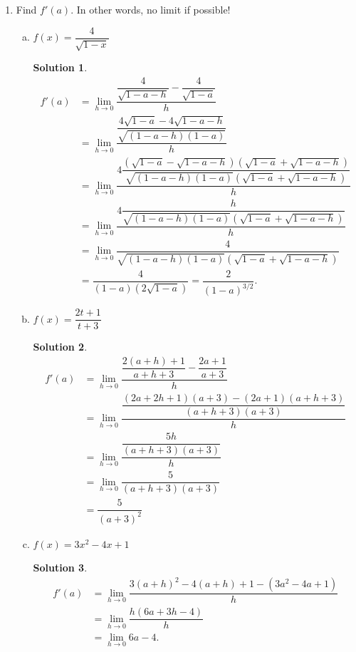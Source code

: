 \documentclass[10pt]{article}
\theoremstyle{Theorem}
\theoremstyle{definition}
\newtheorem*{solution}{Solution}
\theoremstyle{remark}
\theoremstyle{custom}
\begin{document}
\begin{enumerate}[1.]
\begin{enumerate}[a.]
\end{enumerate}
\item Find $f'(a)$. In other words, no limit if possible!
\begin{enumerate}[a.]
\item $f(x)=\dfrac{4}{\sqrt{1-x}}$
\begin{solution}
\begin{align*}
f'(a)&=\lim_{h\rightarrow 0}\dfrac{\dfrac{4}{\sqrt{1-a-h}}-\dfrac{4}{\sqrt{1-a}}}{h}\\[2pt]
&=\lim_{h\rightarrow 0}\dfrac{\dfrac{4\sqrt{1-a}-4\sqrt{1-a-h}}{\sqrt{(1-a-h)(1-a)}}}{h}\\[2pt]
&=\lim_{h\rightarrow 0} \dfrac{4\dfrac{(\sqrt{1-a}-\sqrt{1-a-h})(\sqrt{1-a}+\sqrt{1-a-h})}{\sqrt{(1-a-h)(1-a)}(\sqrt{1-a}+\sqrt{1-a-h})}}{h}\\[2pt]
&=\lim_{h\rightarrow 0}\dfrac{4\dfrac{h}{\sqrt{(1-a-h)(1-a)}(\sqrt{1-a}+\sqrt{1-a-h})}}{h}\\[2pt]
&=\lim_{h\rightarrow 0}\dfrac{4}{\sqrt{(1-a-h)(1-a)}(\sqrt{1-a}+\sqrt{1-a-h})}\\[2pt]
&=\dfrac{4}{(1-a)(2\sqrt{1-a})}=\dfrac{2}{(1-a)^{3/2}}.
\end{align*}
\end{solution}
\newpage
\item $f(x)=\dfrac{2t+1}{t+3}$
\begin{solution}
\begin{align*}
f'(a)&=\lim_{h\rightarrow 0}\dfrac{\dfrac{2(a+h)+1}{a+h+3}-\dfrac{2a+1}{a+3}}{h}\\[2pt]
&=\lim_{h\rightarrow 0}\dfrac{\dfrac{(2a+2h+1)(a+3)-(2a+1)(a+h+3)}{(a+h+3)(a+3)}}{h}\\[2pt]
&=\lim_{h\rightarrow 0} \dfrac{\dfrac{5h}{(a+h+3)(a+3)}}{h}\\[2pt]
&=\lim_{h\rightarrow 0}\dfrac{5}{(a+h+3)(a+3)}\\[2pt]
&=\dfrac{5}{(a+3)^2}
\end{align*}
\end{solution}
\item $f(x)=3x^2-4x+1$
\begin{solution}
\begin{align*}
f'(a)&=\lim_{h\rightarrow 0}\dfrac{3(a+h)^2-4(a+h)+1-(3a^2-4a+1)}{h}\\[2pt]
&=\lim_{h\rightarrow 0} \dfrac{h(6a+3h-4)}{h}\\[2pt]
&=\lim_{h\rightarrow 0} 6a-4.
\end{align*}
\end{solution}
\end{enumerate}

\end{enumerate}
\end{document}

